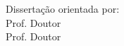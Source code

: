 \begin{center}
\vspace{0.8cm}
\vfill
\large{\selectfont Disserta\c{c}\~{a}o orientada por:}\\
\large{\selectfont Prof. Doutor \Orientador} \\
\large{\selectfont Prof. Doutor \PCoOrientador} \\
\vspace{1.5 cm}
\vfill

\vfill
\PEIAno
\end{center}
\newpage
\mbox{}

\newpage

\setcounter{page}{1}

